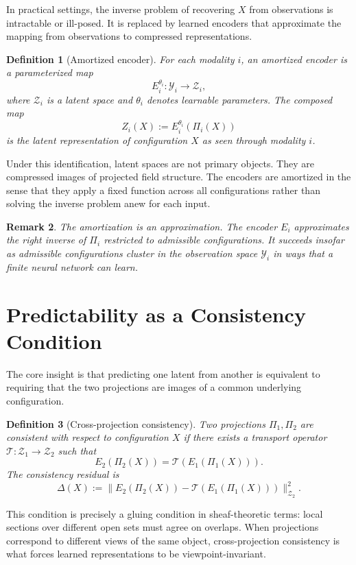 \documentclass[12pt, oneside]{article}
\newtheorem{definition}{Definition}[section]
\newtheorem{remark}[definition]{Remark}
\begin{document}
In practical settings, the inverse problem of recovering $X$ from observations is intractable or ill-posed. It is replaced by learned encoders that approximate the mapping from observations to compressed representations.

\begin{definition}[Amortized encoder]
For each modality $i$, an amortized encoder is a parameterized map
\[
E_i^{\theta_i} : \mathcal{Y}_i \to \mathcal{Z}_i,
\]
where $\mathcal{Z}_i$ is a latent space and $\theta_i$ denotes learnable parameters. The composed map
\[
Z_i(X) := E_i^{\theta_i}(\Pi_i(X))
\]
is the latent representation of configuration $X$ as seen through modality $i$.
\end{definition}

Under this identification, latent spaces are not primary objects. They are compressed images of projected field structure. The encoders are amortized in the sense that they apply a fixed function across all configurations rather than solving the inverse problem anew for each input.

\begin{remark}
The amortization is an approximation. The encoder $E_i$ approximates the right inverse of $\Pi_i$ restricted to admissible configurations. It succeeds insofar as admissible configurations cluster in the observation space $\mathcal{Y}_i$ in ways that a finite neural network can learn.
\end{remark}

\section{Predictability as a Consistency Condition}
\label{sec:consistency}

The core insight is that predicting one latent from another is equivalent to requiring that the two projections are images of a common underlying configuration.

\begin{definition}[Cross-projection consistency]
Two projections $\Pi_1, \Pi_2$ are consistent with respect to configuration $X$ if there exists a transport operator $\mathcal{T} : \mathcal{Z}_1 \to \mathcal{Z}_2$ such that
\[
E_2(\Pi_2(X)) = \mathcal{T}(E_1(\Pi_1(X))).
\]
The consistency residual is
\[
\Delta(X) := \| E_2(\Pi_2(X)) - \mathcal{T}(E_1(\Pi_1(X))) \|_{\mathcal{Z}_2}^2.
\]
\end{definition}

This condition is precisely a gluing condition in sheaf-theoretic terms: local sections over different open sets must agree on overlaps. When projections correspond to different views of the same object, cross-projection consistency is what forces learned representations to be viewpoint-invariant.
\end{document}
